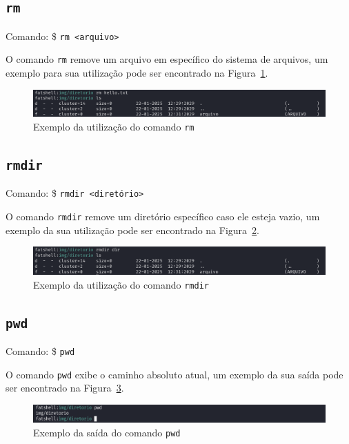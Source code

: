 \documentclass[
    12pt,				%
    oneside,   	        %
    a4paper,			%
    english,			%
    french,				%
    spanish,			%
    brazil,				%
    ]{pacotes/abntex2}
\begin{document}

\subsection{\texttt{rm}}
\label{subsec:rm}
Comando: \$ \texttt{rm <arquivo>}

O comando \texttt{rm} remove um arquivo em específico do sistema de arquivos, um exemplo para sua utilização pode ser encontrado na Figura~\ref{fig:rm}.

\begin{figure}[H]
    \centering
    \includegraphics[width=450pt]{figuras/resultados/16-rm.PNG}
    \caption{Exemplo da utilização do comando \texttt{rm}}
    \label{fig:rm}
\end{figure}


\subsection{\texttt{rmdir}}
\label{subsec:rmdir}
Comando: \$ \texttt{rmdir <diretório>}

O comando \texttt{rmdir} remove um diretório específico caso ele esteja vazio, um exemplo da sua utilização pode ser encontrado na Figura~\ref{fig:rmdir}.

\begin{figure}[H]
    \centering
    \includegraphics[width=450pt]{figuras/resultados/17-rmdir.PNG}
    \caption{Exemplo da utilização do comando \texttt{rmdir}}
    \label{fig:rmdir}
\end{figure}


\subsection{\texttt{pwd}}
\label{subsec:pwd}
Comando: \$ \texttt{pwd}

O comando \texttt{pwd} exibe o caminho absoluto atual, um exemplo da sua saída pode ser encontrado na Figura~\ref{fig:pwd}.

\begin{figure}[H]
    \centering
    \includegraphics[width=450pt]{figuras/resultados/19-pwd.PNG}
    \caption{Exemplo da saída do comando \texttt{pwd}}
    \label{fig:pwd}
\end{figure}
\end{document}
